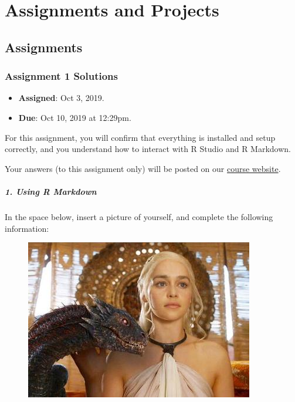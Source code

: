 \documentclass[]{book}
\providecommand{\tightlist}{%
  \setlength{\itemsep}{0pt}\setlength{\parskip}{0pt}}
\begin{document}
\part{Assignments and
Projects}\label{part-assignments-and-projects}

\chapter{Assignments}\label{assignments-1}

\section{Assignment 1 Solutions}\label{assignment-1-solutions}

\begin{itemize}
\tightlist
\item
  \textbf{Assigned}: Oct 3, 2019.
\item
  \textbf{Due}: Oct 10, 2019 at 12:29pm.
\end{itemize}

For this assignment, you will confirm that everything is installed and
setup correctly, and you understand how to interact with R Studio and R
Markdown.

Your answers (to this assignment only) will be posted on our
\href{https://github.com/rochelleterman/plsc-31101}{course website}.

\subsubsection*{1. Using R Markdown}\label{using-r-markdown}

In the space below, insert a picture of yourself, and complete the
following information:

\begin{figure}
\centering
\includegraphics{img/dany.jpg}
\caption{}
\end{figure}
\end{document}
